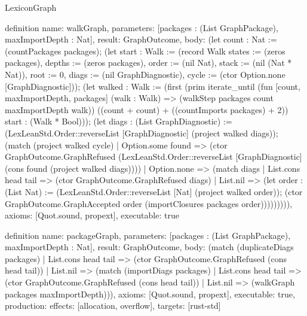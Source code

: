 \begin{lexlean}{LexiconGraph}
\begin{semanticmodule}
definition{
  name: walkGraph,
  parameters: [packages : (List GraphPackage), maxImportDepth : Nat],
  result: GraphOutcome,
  body: (let count : Nat := (countPackages packages); (let start : Walk := (record Walk {states := (zeros packages), depths := (zeros packages), order := (nil Nat), stack := (nil (Nat * Nat)), root := 0, diags := (nil GraphDiagnostic), cycle := (ctor Option.none [GraphDiagnostic])}); (let walked : Walk := (first (prim iterate_until (fun [count, maxImportDepth, packages] (walk : Walk) => (walkStep packages count maxImportDepth walk)) ((count + count) + ((countImports packages) + 2)) start : (Walk * Bool))); (let diags : (List GraphDiagnostic) := (LexLeanStd.Order::reverseList [GraphDiagnostic] (project walked diags)); (match (project walked cycle)
    | Option.some found => (ctor GraphOutcome.GraphRefused (LexLeanStd.Order::reverseList [GraphDiagnostic] (cons found (project walked diags))))
    | Option.none => (match diags
      | List.cons head tail => (ctor GraphOutcome.GraphRefused diags)
      | List.nil => (let order : (List Nat) := (LexLeanStd.Order::reverseList [Nat] (project walked order)); (ctor GraphOutcome.GraphAccepted order (importClosures packages order))))))))),
  axioms: [Quot.sound, propext],
  executable: true
}

definition{
  name: packageGraph,
  parameters: [packages : (List GraphPackage), maxImportDepth : Nat],
  result: GraphOutcome,
  body: (match (duplicateDiags packages)
    | List.cons head tail => (ctor GraphOutcome.GraphRefused (cons head tail))
    | List.nil => (match (importDiags packages)
      | List.cons head tail => (ctor GraphOutcome.GraphRefused (cons head tail))
      | List.nil => (walkGraph packages maxImportDepth))),
  axioms: [Quot.sound, propext],
  executable: true,
  production: {effects: [allocation, overflow], targets: [rust-std]}
}
\end{semanticmodule}
\end{lexlean}
